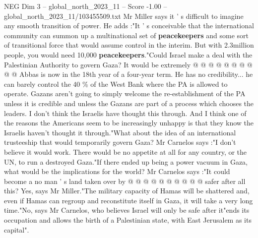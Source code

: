 \begin{textsample}{NEG Dim 3 – global\_north\_2023\_11 – Score -1.00 – global\_north\_2023\_11/103455509.txt}
Mr Miller says it ' s difficult to imagine any smooth transition of power.
He adds :"It ' s conceivable that the international community can summon up a multinational set of \textbf{peacekeepers} and some sort of transitional force that would assume control in the interim.
But with 2.3million people, you would need 10,000 \textbf{peacekeepers}."Could Israel make a deal with the Palestinian Authority to govern Gaza?
It would be extremely @ @ @ @ @ @ @ @ @ @ Abbas is now in the 18th year of a four-year term.
He has no credibility... he can barely control the 40 \% of the West Bank where the PA is allowed to operate.
Gazans aren't going to simply welcome the re-establishment of the PA unless it is credible and unless the Gazans are part of a process which chooses the leaders.
I don't think the Israelis have thought this through.
And I think one of the reasons the Americans seem to be increasingly unhappy is that they know the Israelis haven't thought it through."What about the idea of an international trusteeship that would temporarily govern Gaza?
Mr Carnelos says :"I don't believe it would work.
There would be no appetite at all for any country, or the UN, to run a destroyed Gaza."If there ended up being a power vacuum in Gaza, what would be the implications for the world?
Mr Carnelos says :"It could become a no man ' s land taken over by @ @ @ @ @ @ @ @ @ @ safer after all this?
Yes, says Mr Miller."The military capacity of Hamas will be shattered and, even if Hamas can regroup and reconstitute itself in Gaza, it will take a very long time."No, says Mr Carnelos, who believes Israel will only be safe after it"ends its occupation and allows the birth of a Palestinian state, with East Jerusalem as its capital".

\end{textsample}
